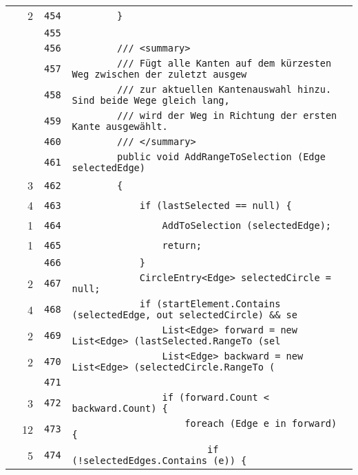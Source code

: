 \documentclass[a4paper,10pt]{article}
\begin{document}
\begin{longtable}[l]{lrrl}
\cellcolor{green} & 2 & \verb~454~ & \verb~        }~\\
\cellcolor{gray} &  & \verb~455~ & \verb~~\\
\cellcolor{gray} &  & \verb~456~ & \verb~        /// <summary>~\\
\cellcolor{gray} &  & \verb~457~ & \verb~        /// Fügt alle Kanten auf dem kürzesten Weg zwischen der zuletzt ausgew~\\
\cellcolor{gray} &  & \verb~458~ & \verb~        /// zur aktuellen Kantenauswahl hinzu. Sind beide Wege gleich lang,~\\
\cellcolor{gray} &  & \verb~459~ & \verb~        /// wird der Weg in Richtung der ersten Kante ausgewählt.~\\
\cellcolor{gray} &  & \verb~460~ & \verb~        /// </summary>~\\
\cellcolor{gray} &  & \verb~461~ & \verb~        public void AddRangeToSelection (Edge selectedEdge)~\\
\cellcolor{green} & 3 & \verb~462~ & \verb~        {~\\
\cellcolor{green} & 4 & \verb~463~ & \verb~            if (lastSelected == null) {~\\
\cellcolor{green} & 1 & \verb~464~ & \verb~                AddToSelection (selectedEdge);~\\
\cellcolor{green} & 1 & \verb~465~ & \verb~                return;~\\
\cellcolor{gray} &  & \verb~466~ & \verb~            }~\\
\cellcolor{green} & 2 & \verb~467~ & \verb~            CircleEntry<Edge> selectedCircle = null;~\\
\cellcolor{green} & 4 & \verb~468~ & \verb~            if (startElement.Contains (selectedEdge, out selectedCircle) && se~\\
\cellcolor{green} & 2 & \verb~469~ & \verb~                List<Edge> forward = new List<Edge> (lastSelected.RangeTo (sel~\\
\cellcolor{green} & 2 & \verb~470~ & \verb~                List<Edge> backward = new List<Edge> (selectedCircle.RangeTo (~\\
\cellcolor{gray} &  & \verb~471~ & \verb~~\\
\cellcolor{green} & 3 & \verb~472~ & \verb~                if (forward.Count < backward.Count) {~\\
\cellcolor{green} & 12 & \verb~473~ & \verb~                    foreach (Edge e in forward) {~\\
\cellcolor{green} & 5 & \verb~474~ & \verb~                        if (!selectedEdges.Contains (e)) {~\\

\end{longtable}
\end{document}
